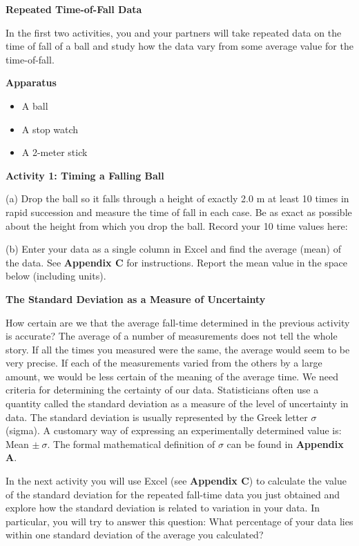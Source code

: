 \textbf{Repeated Time-of-Fall Data} 

In the first two activities, you and your partners will take repeated data on
the time of fall of a ball and study how the data vary from some average value
for the time-of-fall.

\textbf{Apparatus} 

\begin{itemize}
\item A ball 
\item A stop watch 
\item A 2-meter stick
\end{itemize}
\textbf{Activity 1: Timing a Falling Ball} 

(a) Drop the ball so it falls through a height of exactly 2.0 m at least 10
times in rapid succession and measure the time of fall in each case. Be as exact as possible about the height from which you drop the ball. Record your 10 time values here:
\vspace{50mm}

(b) Enter your data as a single column in Excel and find the 
average (mean) of the data.
See \textbf{Appendix C} for instructions. Report the
mean value in the space below (including units).
\vspace{10mm}

\textbf{The Standard Deviation as a Measure of Uncertainty }

How certain are we that the average fall-time determined in the previous activity
is accurate? The average of a number of measurements does not tell the whole
story. If all the times you measured were the same, the average would seem to
be very precise. If each of the measurements varied from the others by a large
amount, we would be less certain of the meaning of the average time. We need
criteria for determining the certainty of our data. Statisticians often use
a quantity called the standard deviation as a measure of the level of uncertainty
in data. The standard deviation is usually represented by the Greek letter \( \sigma  \)
(sigma). A customary way of expressing an experimentally determined value is:
Mean  \( \pm \ \sigma  \). The formal mathematical definition of \( \sigma  \)
can be found in \textbf{Appendix A}.

In the next activity you will use Excel (see \textbf{Appendix C}) to calculate
the value of the standard deviation for the repeated fall-time data you just
obtained and explore how the standard deviation is related to variation in your
data. In particular, you will try to answer this question: What percentage of
your data lies within one standard deviation of the average you calculated?


